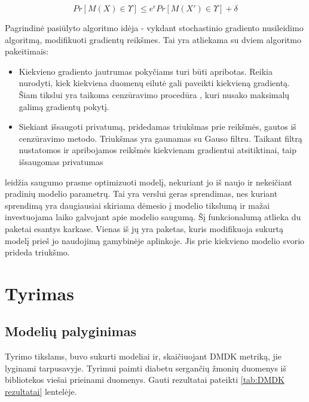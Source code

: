 \documentclass{VUMIFInfBakalaurinis}
\begin{document}
\begin{equation}
    Pr[M(X) \in \Upsilon] \leq e^{\epsilon} Pr[M(X') \in \Upsilon] + \delta
    \label{eq:Diferencinio privaluto sąlyga}
\end{equation}

\par Pagrindinė pasiūlyto algoritmo idėja - vykdant stochastinio gradiento nusileidimo algoritmą, modifikuoti gradientų reikšmes. Tai yra atliekama su dviem algoritmo pakeitimais:

\begin{itemize}
    \item Kiekvieno gradiento jautrumas pokyčiams turi būti apribotas. Reikia nurodyti, kiek kiekviena duomenų eilutė gali paveikti kiekvieną gradientą. Šiam tikslui yra taikoma cenzūravimo procedūra , kuri nusako maksimalų galimą gradientų pokytį.
    \item Siekiant išsaugoti privatumą, pridedamas triukšmas prie reikšmės, gautos iš cenzūravimo metodo. Triukšmas yra gaunamas su Gauso filtru. Taikant filtrą nustatomos ir apribojamos reikšmės kiekvienam gradientui atsitiktinai, taip išsaugomas privatumas
\end{itemize}

\par {} leidžia saugumo prasme optimizuoti modelį, nekuriant jo iš naujo ir nekeičiant pradinių modelio parametrų. Tai yra verslui geras sprendimas, nes kuriant sprendimą yra daugiausiai skiriama dėmesio į modelio tikslumą ir mažai investuojama laiko galvojant apie modelio saugumą. Šį funkcionalumą atlieka du paketai esantys  karkase. Vienas iš jų yra  paketas, kuris modifikuoja sukurtą modelį prieš jo naudojimą gamybinėje aplinkoje. Jis prie kiekvieno modelio svorio prideda triukšmo.

\section{Tyrimas}
\subsection{Modelių palyginimas}

\par Tyrimo tikslams, buvo sukurti modeliai ir, skaičiuojant DMDK metriką, jie lyginami tarpusavyje. Tyrimui paimti diabetu sergančių žmonių duomenys iš  bibliotekos viešai prieinami duomenys. Gauti rezultatai pateikti \ref{tab:DMDK rezultatai} lentelėje.
\end{document}
